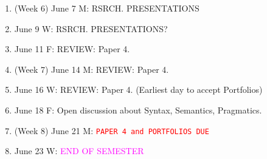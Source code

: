 \documentclass[11pt]{article}
\begin{document}
\begin{enumerate}
\item (Week 6) June 7 M: RSRCH. PRESENTATIONS 
\item[] June 9 W: RSRCH. PRESENTATIONS? 
\item[] June 11 F: REVIEW: Paper 4.

\item (Week 7) June 14 M: REVIEW: Paper 4.
\item[] June 16 W: REVIEW: Paper 4. (Earliest day to accept Portfolios)
\item[] June 18 F: Open discussion about Syntax, Semantics, Pragmatics.

\item (Week 8) June 21 M: \textcolor{red}{\texttt{PAPER 4 and PORTFOLIOS DUE}}
\item[] June 23 W: \textcolor{magenta}{END OF SEMESTER}
\end{enumerate}
% 
% 
\end{document}
